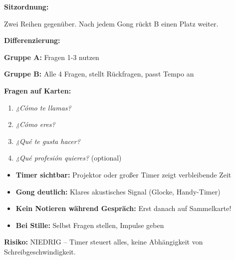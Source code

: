 \documentclass[11pt, a4paper]{article}
\begin{document}
\begin{minipage}[t]{0.48\textwidth}
{\bfseries Sitzordnung:}

\begin{center}
\end{center}

Zwei Reihen gegenüber. Nach jedem Gong rückt B einen Platz weiter.
\end{minipage}
\hfill
\begin{minipage}[t]{0.48\textwidth}
{\bfseries Differenzierung:}

\textcolor{spanisch}{\textbf{Gruppe A:}} Fragen 1-3 nutzen

\textcolor{alternativeB}{\textbf{Gruppe B:}} Alle 4 Fragen, stellt Rückfragen, passt Tempo an

\vspace{0.3cm}

{\bfseries Fragen auf Karten:}
\begin{enumerate}[nosep, leftmargin=1.2em]
\item \textcolor{spanisch}{\textit{¿Cómo te llamas?}}
\item \textcolor{spanisch}{\textit{¿Cómo eres?}}
\item \textcolor{spanisch}{\textit{¿Qué te gusta hacer?}}
\item \textcolor{spanisch}{\textit{¿Qué profesión quieres?}} {\scriptsize(optional)}
\end{enumerate}
\end{minipage}

\vspace{0.4cm}

\begin{tcolorbox}[colback=success!10, colframe=success, boxrule=1pt, arc=0pt, title={\textbf{Tipps für die Beobachtung}}]
\begin{itemize}[nosep, leftmargin=1em]
\item \textbf{Timer sichtbar:} Projektor oder großer Timer zeigt verbleibende Zeit
\item \textbf{Gong deutlich:} Klares akustisches Signal (Glocke, Handy-Timer)
\item \textbf{Kein Notieren während Gespräch:} Erst danach auf Sammelkarte!
\item \textbf{Bei Stille:} Selbst Fragen stellen, Impulse geben
\end{itemize}
\end{tcolorbox}

\vspace{0.3cm}

{\small\color{grau}\textbf{Risiko:} NIEDRIG -- Timer steuert alles, keine Abhängigkeit von Schreibgeschwindigkeit.}
\end{document}

